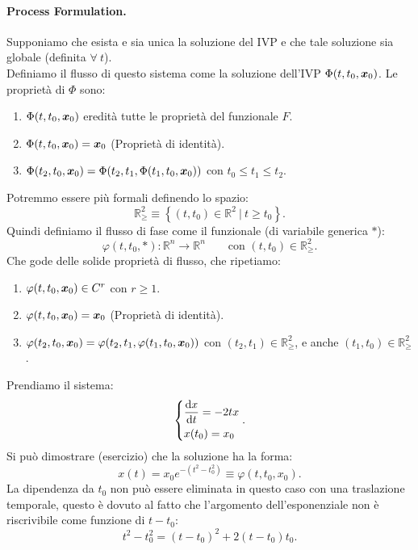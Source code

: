 \paragraph{Process Formulation.}%
\label{par:Process Formulation.}
Supponiamo che esista e sia unica la soluzione del IVP e che tale soluzione sia globale (definita $\forall \ t$).\\
Definiamo il flusso di questo sistema come la soluzione dell'IVP $\Phi(t, t_0, \boldsymbol{x}_0)$. Le proprietà di $\Phi$  sono:
\begin{enumerate}
    \item $\Phi(t, t_0, \boldsymbol{x}_0)$ eredità tutte le proprietà del funzionale $F$.
    \item $\Phi(t, t_0, \boldsymbol{x}_0) = \boldsymbol{x}_0$ (Proprietà di identità).
    \item $\Phi(t_2, t_0, \boldsymbol{x}_0) = \Phi(t_2, t_1, \Phi(t_1, t_0, \boldsymbol{x}_0))$ con $t_0 \le t_1\le t_2$.
\end{enumerate}
Potremmo essere più formali definendo lo spazio:
\[
    \mathbb{R}^2_{\ge } \equiv \left\{ (t, t_0) \in \mathbb{R}^2 \ | \ t \ge t_0\right\}
.\] 
Quindi definiamo il flusso di fase come il funzionale (di variabile generica $*$):
\[
    \varphi (t,t_0,*):\mathbb{R}^n\to \mathbb{R}^n \qquad \text{con } (t, t_0) \in \mathbb{R}^2_{\ge }
.\] 
Che gode delle solide proprietà di flusso, che ripetiamo:
\begin{enumerate}
    \item $\varphi(t, t_0, \boldsymbol{x}_0) \in C^r$ con $r\ge 1$.
    \item $\varphi(t, t_0, \boldsymbol{x}_0) = \boldsymbol{x}_0$ (Proprietà di identità).
    \item $\varphi(t_2, t_0, \boldsymbol{x}_0) = \varphi(t_2, t_1, \varphi(t_1, t_0, \boldsymbol{x}_0))$ con $(t_2, t_1) \in \mathbb{R}^2_{\ge }$, e anche $(t_1, t_0) \in \mathbb{R}^2_{\ge }$ .
\end{enumerate}
\begin{exmp}
    Prendiamo il sistema:
    \[
        \begin{dcases}
	    \frac{\text{d} x}{\text{d} t} = -2tx\\
	    x(t_0) = x_0
        \end{dcases}
    .\] 
    Si può dimostrare (esercizio) che la soluzione ha la forma:
    \[
	x(t)=x_0e^{-(t^2-t_0^2)} \equiv \varphi (t, t_0, x_0)
    .\] 
    La dipendenza da $t_0$ non può essere eliminata in questo caso con una traslazione temporale, questo è dovuto al fatto che l'argomento dell'esponenziale non è riscrivibile come funzione di $t-t_0$:
    \[
	t^2-t_0^2 = \left(t-t_0\right)^2 + 2(t-t_0)t_0
    .\] 
\end{exmp}
\noindent
